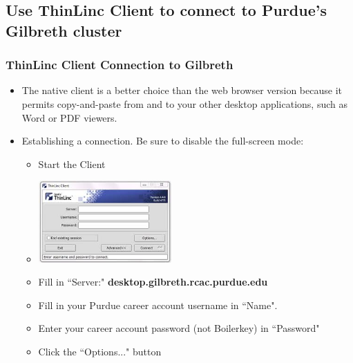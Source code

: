 \documentclass[aspectratio=169]{beamer}
\begin{document}
\subsection{Use ThinLinc Client to connect to Purdue's Gilbreth cluster}

\begin{frame}
\frametitle{ThinLinc Client Connection to Gilbreth}

\begin{itemize}
\item The native client is a better choice than the web browser version because it permits copy-and-paste from and to your other desktop applications, such as Word or PDF viewers.

\item Establishing a connection. Be sure to disable the full-screen mode:
\begin{itemize}
	\item Start the Client
	\item \includegraphics[width=2in]{ThinLincClientView.jpeg}
	\item Fill in ``Server:" {\bf desktop.gilbreth.rcac.purdue.edu}
	\item Fill in your Purdue career account username in ``Name".
	\item Enter your career account password (not Boilerkey) in ``Password"
  	\item Click the ``Options..." button
\end{itemize}

\end{itemize}
\end{frame}
\end{document}
